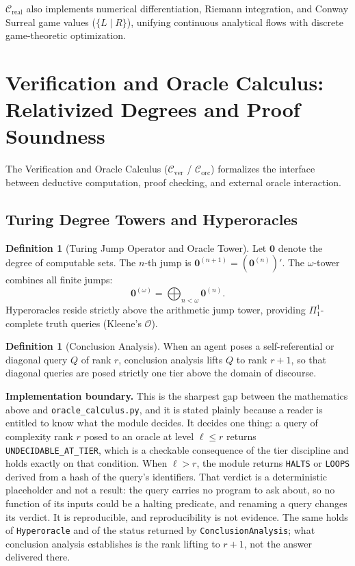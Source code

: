 \documentclass[11pt]{article}
\theoremstyle{definition}
\newtheorem{definition}[theorem]{Definition}
\begin{document}
$\mathcal{C}_{\mathrm{real}}$ also implements numerical differentiation, Riemann integration, and Conway Surreal game values ($\{L \mid R\}$), unifying continuous analytical flows with discrete game-theoretic optimization.

\section{Verification and Oracle Calculus: Relativized Degrees and Proof Soundness}
The Verification and Oracle Calculus ($\mathcal{C}_{\mathrm{ver}}$ / $\mathcal{C}_{\mathrm{orc}}$) formalizes the interface between deductive computation, proof checking, and external oracle interaction.

\subsection{Turing Degree Towers and Hyperoracles}
\begin{definition}[Turing Jump Operator and Oracle Tower]
Let $\mathbf{0}$ denote the degree of computable sets. The $n$-th jump is $\mathbf{0}^{(n+1)} = (\mathbf{0}^{(n)})'$. The $\omega$-tower combines all finite jumps:
\[
\mathbf{0}^{(\omega)} = \bigoplus_{n < \omega} \mathbf{0}^{(n)}.
\]
Hyperoracles reside strictly above the arithmetic jump tower, providing $\Pi^1_1$-complete truth queries (Kleene's $\mathcal{O}$).
\end{definition}

\begin{definition}[Conclusion Analysis]
When an agent poses a self-referential or diagonal query $Q$ of rank $r$, conclusion analysis lifts $Q$ to rank $r+1$, so that diagonal queries are posed strictly one tier above the domain of discourse.
\end{definition}

\noindent\textbf{Implementation boundary.} This is the sharpest gap between the mathematics above and \texttt{oracle\_calculus.py}, and it is stated plainly because a reader is entitled to know what the module decides. It decides one thing: a query of complexity rank $r$ posed to an oracle at level $\ell \le r$ returns \texttt{UNDECIDABLE\_AT\_TIER}, which is a checkable consequence of the tier discipline and holds exactly on that condition. When $\ell > r$, the module returns \texttt{HALTS} or \texttt{LOOPS} derived from a hash of the query's identifiers. That verdict is a deterministic placeholder and not a result: the query carries no program to ask about, so no function of its inputs could be a halting predicate, and renaming a query changes its verdict. It is reproducible, and reproducibility is not evidence. The same holds of \texttt{Hyperoracle} and of the status returned by \texttt{ConclusionAnalysis}; what conclusion analysis establishes is the rank lifting to $r+1$, not the answer delivered there.
\end{document}
